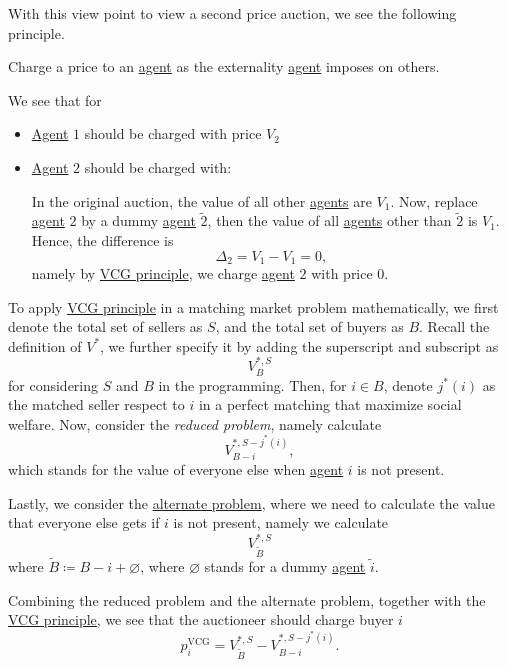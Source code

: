 With this view point to view a second price auction, we see the following principle.
\begin{theorem}\label{thm:VCG}
	Charge a price to an \hyperref[def:player]{agent} as the externality \hyperref[def:player]{agent} imposes on others.
\end{theorem}
\begin{eg}
	We see that for
	\begin{itemize}
		\item \hyperref[def:player]{Agent} \(1\) should be charged with price \(V_2\)
		\item \hyperref[def:player]{Agent} \(2\) should be charged with:

		      In the original auction, the value of all other \hyperref[def:player]{agents} are \(V_{1}\). Now, replace \hyperref[def:player]{agent} \(2\) by a dummy \hyperref[def:player]{agent} \(\tilde{2}\), then the value of all \hyperref[def:player]{agents} other than \(\tilde{2}\) is \(V_{1}\). Hence, the difference is
		      \[
			      \Delta_{2} = V_{1} - V_{1} = 0,
		      \]
		      namely by \hyperref[thm:VCG]{VCG principle}, we charge \hyperref[def:player]{agent} \(2\) with price \(0\).
	\end{itemize}
\end{eg}

To apply \hyperref[thm:VCG]{VCG principle} in a matching market problem mathematically, we first denote the total set of sellers as \(S\), and the total set of buyers as \(B\). Recall the definition of \(V^{\ast}\), we further specify it by adding the superscript and subscript as
\[
	V^{*, S}_{B}
\]
for considering \(S\) and \(B\) in the programming. Then, for \(i\in B\), denote \(j^{\ast} (i)\) as the matched seller respect to \(i\) in a perfect matching that maximize social welfare. Now, consider the \emph{reduced problem}, namely calculate
\[
	V^{*, S-j^{\ast}(i)}_{B-i},
\]
which stands for the value of everyone else when \hyperref[def:player]{agent} \(i\) is not present.

Lastly, we consider the \underline{alternate problem}, where we need to calculate the value that everyone else gets if \(i\) is not present, namely we calculate
\[
	V^{*, S}_{\widetilde{B}}
\]
where \(\widetilde{B} \coloneqq B - i + \varnothing \), where \(\varnothing \) stands for a dummy \hyperref[def:player]{agent} \(\widetilde{i} \).

Combining the reduced problem and the alternate problem, together with the \hyperref[thm:VCG]{VCG principle}, we see that the auctioneer should charge buyer \(i\)
\[
	p_{i}^\mathrm{VCG} = V_{\widetilde{B} }^{*, S} - V_{B-i}^{\ast, S-j^{\ast} (i)}.
\]

